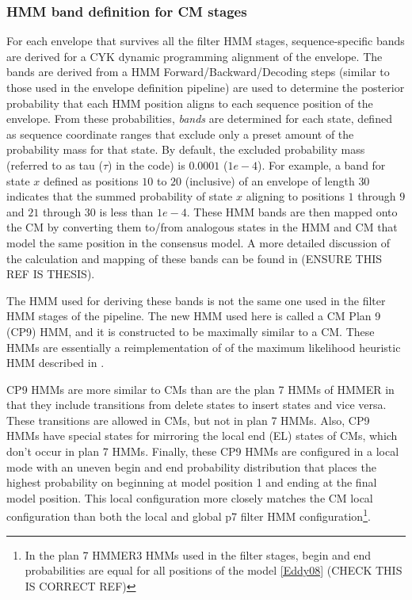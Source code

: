 \begin{sreoutput}
\subsubsection{HMM band definition for CM stages}

For each envelope that survives all the filter HMM stages,
sequence-specific bands are derived for a CYK dynamic programming
alignment of the envelope. The bands are derived from a HMM
Forward/Backward/Decoding steps (similar to those used in the envelope
definition pipeline) are used to determine the posterior probability
that each HMM position aligns to each sequence position of the
envelope. From these probabilities, \emph{bands} are determined for
each state, defined as sequence coordinate ranges that exclude only a
preset amount of the probability mass for that state. By default, the
excluded probability mass (referred to as tau ($\tau$) in the code) is
$0.0001$ ($1e-4$). For example, a band for state $x$ defined as
positions $10$ to $20$ (inclusive) of an envelope of length $30$
indicates that the summed probability of state $x$ aligning to
positions $1$ through $9$ and $21$ through $30$ is less than
$1e-4$. These HMM bands are then mapped onto the CM by converting them
to/from analogous states in the HMM and CM that model the same
position in the consensus model. A more detailed discussion of the
calculation and mapping of these bands can be found in
\cite{Nawrocki09} (ENSURE THIS REF IS THESIS).

The HMM used for deriving these bands is not the same one used in the
filter HMM stages of the pipeline. The new HMM used here is called a
CM Plan 9 (CP9) HMM, and it is constructed to be maximally similar to
a CM. These HMMs are essentially a reimplementation of of the maximum
likelihood heuristic HMM described in \cite{WeinbergRuzzo06}. 


CP9 HMMs are more similar to CMs than are the plan 7 HMMs of HMMER in
that they include transitions from delete states to insert states and
vice versa. These transitions are allowed in CMs, but not in plan 7
HMMs. Also, CP9 HMMs have special states for mirroring the local end
(EL) states of CMs, which don't occur in plan 7 HMMs.  Finally, these
CP9 HMMs are configured in a local mode with an uneven begin and end
probability distribution that places the highest probability on
beginning at model position 1 and ending at the final model position.
This local configuration more closely matches the CM local
configuration than both the local and global p7 filter HMM
configuration\footnote{In the plan 7 HMMER3 HMMs used in the filter
  stages, begin and end probabilities are equal for all positions of
  the model \ref{Eddy08} (CHECK THIS IS CORRECT REF)}.


\end{sreoutput}
